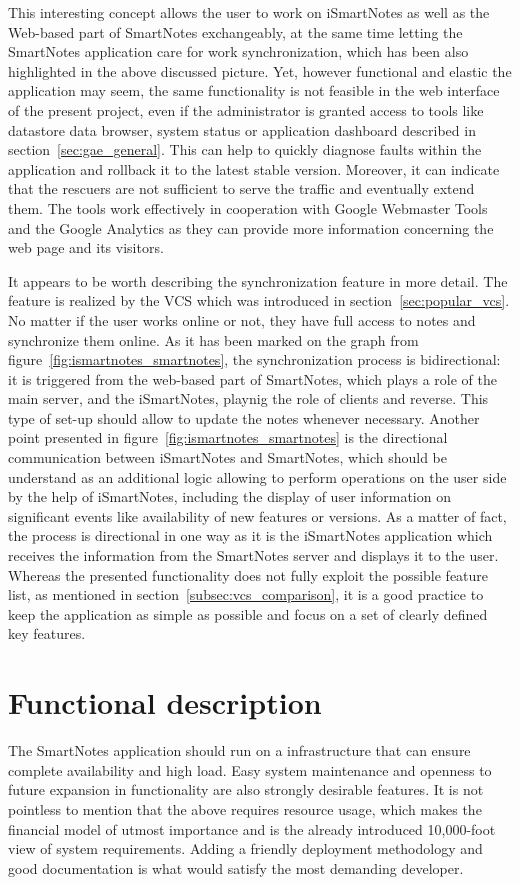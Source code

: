 This interesting concept allows the user to work on iSmartNotes as well as the Web-based part of SmartNotes exchangeably, at the same time letting the SmartNotes application care for work synchronization, which has been also highlighted in the above discussed picture. Yet, however functional and elastic the application may seem, the same functionality is not feasible in the web interface of the present project, even if the administrator is granted access to tools like datastore data browser, system status or application dashboard described in section~\ref{sec:gae_general}. This can help to quickly diagnose faults within the application and rollback it to the latest stable version. Moreover,  it can indicate that the rescuers are not sufficient to serve the traffic and eventually extend them. The tools work effectively in cooperation with Google Webmaster Tools and the Google Analytics as they can provide more information concerning the web page and its visitors.

It appears to be worth describing the synchronization feature in more detail. The feature is realized by the VCS which was introduced in section~\ref{sec:popular_vcs}. No matter if the user works online or not, they have full access to notes and synchronize them online. As it has been marked on the graph from figure~\ref{fig:ismartnotes_smartnotes}, the synchronization process is bidirectional: it is triggered from the web-based part of SmartNotes, which plays a role of the main server, and the iSmartNotes, playnig the role of clients and reverse. This type of set-up should allow to update the notes whenever necessary. Another point presented in figure~\ref{fig:ismartnotes_smartnotes} is the directional communication between iSmartNotes and SmartNotes, which should be understand as an additional logic allowing to perform operations on the user side by the help of iSmartNotes, including the display of user information on significant events like availability of new features or versions.  As a matter of fact, the process is directional in one way as it is the iSmartNotes application which receives the information from the SmartNotes server and displays it to the user. Whereas the presented functionality does not fully exploit the possible feature list, as mentioned in section~\ref{subsec:vcs_comparison}, it is a good practice to keep the application as simple as possible and focus on a set of clearly defined key features.

\section{Functional description}\label{sec:functional_descr}
The SmartNotes application should run on a infrastructure that can ensure complete availability and high load. Easy system maintenance and openness to future expansion in functionality are also strongly desirable features. It is not pointless to mention that the above requires resource usage, which makes the financial model of utmost importance and is the already introduced 10,000-foot view of system requirements. Adding a friendly deployment methodology and good documentation is what would satisfy the most demanding developer.


